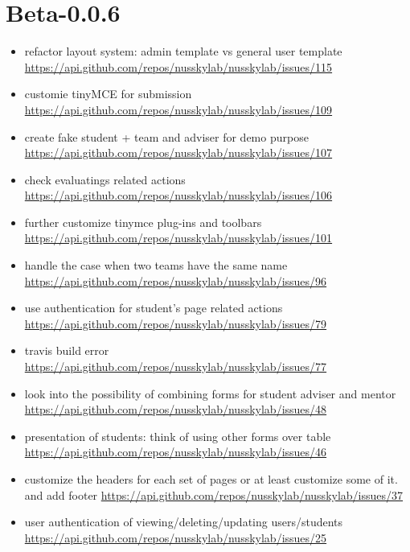 {\section{Beta-0.0.6}
\begin{itemize}[noitemsep]
    \item refactor layout system: admin template vs general user template \url{https://api.github.com/repos/nusskylab/nusskylab/issues/115} 
    \item customie tinyMCE for submission \url{https://api.github.com/repos/nusskylab/nusskylab/issues/109} 
    \item create fake student + team and adviser for demo purpose \url{https://api.github.com/repos/nusskylab/nusskylab/issues/107} 
    \item check evaluatings related actions \url{https://api.github.com/repos/nusskylab/nusskylab/issues/106} 
    \item further customize tinymce plug-ins and toolbars \url{https://api.github.com/repos/nusskylab/nusskylab/issues/101} 
    \item handle the case when two teams have the same name \url{https://api.github.com/repos/nusskylab/nusskylab/issues/96} 
    \item use authentication for student's page related actions \url{https://api.github.com/repos/nusskylab/nusskylab/issues/79} 
    \item travis build error \url{https://api.github.com/repos/nusskylab/nusskylab/issues/77} 
    \item look into the possibility of combining forms for student  adviser and mentor \url{https://api.github.com/repos/nusskylab/nusskylab/issues/48} 
    \item presentation of students: think of using other forms over table \url{https://api.github.com/repos/nusskylab/nusskylab/issues/46} 
    \item customize the headers for each set of pages  or at least customize some of it. and add footer \url{https://api.github.com/repos/nusskylab/nusskylab/issues/37} 
    \item user authentication of viewing/deleting/updating users/students \url{https://api.github.com/repos/nusskylab/nusskylab/issues/25} 
\end{itemize}

}
